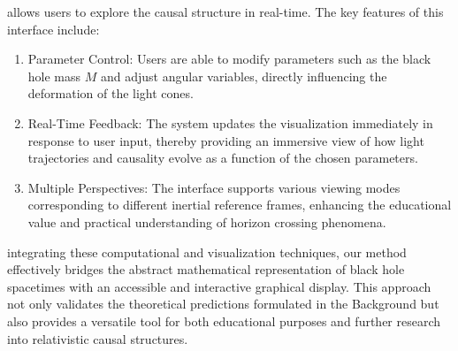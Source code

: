 \documentclass{article}
\begin{document}
allows users to explore the causal structure in real-time. The key features of this interface include:\n\begin{enumerate}\n  \item Parameter Control: Users are able to modify parameters such as the black hole mass $M$ and adjust angular variables, directly influencing the deformation of the light cones.\n  \item Real-Time Feedback: The system updates the visualization immediately in response to user input, thereby providing an immersive view of how light trajectories and causality evolve as a function of the chosen parameters.\n  \item Multiple Perspectives: The interface supports various viewing modes corresponding to different inertial reference frames, enhancing the educational value and practical understanding of horizon crossing phenomena.\n\end{enumerate}\n\nBy integrating these computational and visualization techniques, our method effectively bridges the abstract mathematical representation of black hole spacetimes with an accessible and interactive graphical display. This approach not only validates the theoretical predictions formulated in the Background but also provides a versatile tool for both educational purposes and further research into relativistic causal structures.
\end{document}
